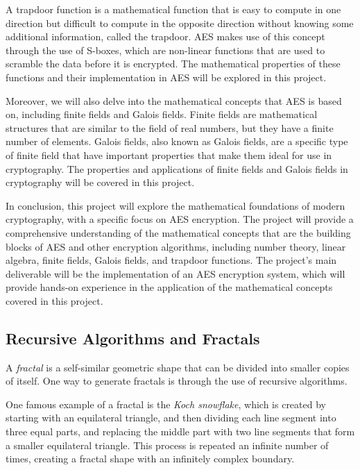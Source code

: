 \documentclass{article}
\begin{document}
    \vspace{3mm}
    A trapdoor function is a mathematical function that is easy to compute in one direction but difficult to compute in the opposite direction without knowing some additional information, called the trapdoor. AES makes use of this concept through the use of S-boxes, which are non-linear functions that are used to scramble the data before it is encrypted. The mathematical properties of these functions and their implementation in AES will be explored in this project.
    
    \vspace{3mm}
    Moreover, we will also delve into the mathematical concepts that AES is based on, including finite fields and Galois fields. Finite fields are mathematical structures that are similar to the field of real numbers, but they have a finite number of elements. Galois fields, also known as Galois fields, are a specific type of finite field that have important properties that make them ideal for use in cryptography. The properties and applications of finite fields and Galois fields in cryptography will be covered in this project.
    
    \vspace{3mm}
    In conclusion, this project will explore the mathematical foundations of modern cryptography, with a specific focus on AES encryption. The project will provide a comprehensive understanding of the mathematical concepts that are the building blocks of AES and other encryption algorithms, including number theory, linear algebra, finite fields, Galois fields, and trapdoor functions. The project's main deliverable will be the implementation of an AES encryption system, which will provide hands-on experience in the application of the mathematical concepts covered in this project.

\pagebreak

\subsection*{Recursive Algorithms and Fractals}
    A \textit{fractal} is a self-similar geometric shape that can be divided into smaller copies of itself. One way to generate fractals is through the use of recursive algorithms.
    
    \vspace{3mm}
    One famous example of a fractal is the \textit{Koch snowflake}, which is created by starting with an equilateral triangle, and then dividing each line segment into three equal parts, and replacing the middle part with two line segments that form a smaller equilateral triangle. This process is repeated an infinite number of times, creating a fractal shape with an infinitely complex boundary.
    
\end{document}
